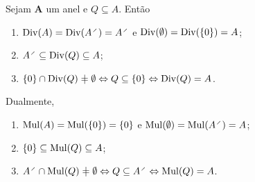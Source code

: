 \begin{proposition}
Sejam $\bm A$ um anel e $Q \subseteq A$. Então
	\begin{enumerate}
	\item $\divv(A) = \divv(A^{\div}) = A^{\div}$ e $\operatorname{Div}(\emptyset) = \operatorname{Div}(\{0\}) = A$;
	\item $A^{\div} \subseteq \divv(Q) \subseteq A$;
	\item $\{0\} \cap \divv(Q) \neq \emptyset \Leftrightarrow Q \subseteq \{0\} \Leftrightarrow \divv(Q)=A$.
	\end{enumerate}

	Dualmente,
	\begin{enumerate}
	\item $\operatorname{Mul}(A) = \operatorname{Mul}(\{0\}) = \{0\}$ e $\mul(\emptyset) = \mul(A^{\div}) = A$;
	\item $\{0\} \subseteq \operatorname{Mul}(Q) \subseteq A$;
	\item $A^{\div} \cap \mul(Q) \neq \emptyset \Leftrightarrow Q \subseteq A^{\div} \Leftrightarrow \mul(Q) = A$.
	\end{enumerate}
\end{proposition}
